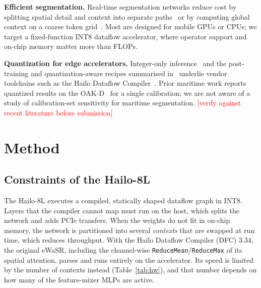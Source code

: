 \documentclass[conference]{IEEEtran}
\newcommand{\tbd}[1]{\textcolor{red}{[#1]}}
\begin{document}
\textbf{Efficient segmentation.} Real-time segmentation networks reduce cost by splitting spatial detail and context into separate paths~\cite{yu2018bisenet} or by computing global context on a coarse token grid~\cite{zhang2022topformer}. Most are designed for mobile GPUs or CPUs; we target a fixed-function INT8 dataflow accelerator, where operator support and on-chip memory matter more than FLOPs.

\textbf{Quantization for edge accelerators.} Integer-only inference~\cite{jacob2018quantization} and the post-training and quantization-aware recipes summarised in~\cite{krishnamoorthi2018quantizing,nagel2021white} underlie vendor toolchains such as the Hailo Dataflow Compiler~\cite{hailo_dfc}. Prior maritime work reports quantized results on the OAK-D~\cite{tersek2023ewasr} for a single calibration; we are not aware of a study of calibration-set sensitivity for maritime segmentation. \tbd{verify against recent literature before submission}

\section{Method}
\label{sec:method}
\subsection{Constraints of the Hailo-8L}
The Hailo-8L executes a compiled, statically shaped dataflow graph in INT8. Layers that the compiler cannot map must run on the host, which splits the network and adds PCIe transfers. When the weights do not fit in on-chip memory, the network is partitioned into several \emph{contexts} that are swapped at run time, which reduces throughput. With the Hailo Dataflow Compiler (DFC) 3.34, the original eWaSR, including the channel-wise \texttt{ReduceMean}/\texttt{ReduceMax} of its spatial attention, parses and runs entirely on the accelerator. Its speed is limited by the number of contexts instead (Table~\ref{tab:hw}), and that number depends on how many of the feature-mixer MLPs are active.
\end{document}
